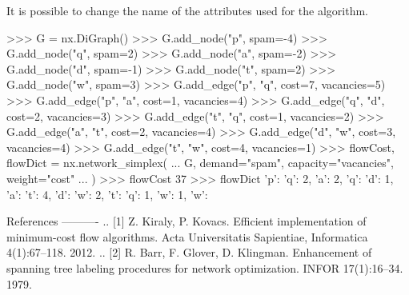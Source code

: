 \begin{DoxyVerb}
It is possible to change the name of the attributes used for the
algorithm.

>>> G = nx.DiGraph()
>>> G.add_node("p", spam=-4)
>>> G.add_node("q", spam=2)
>>> G.add_node("a", spam=-2)
>>> G.add_node("d", spam=-1)
>>> G.add_node("t", spam=2)
>>> G.add_node("w", spam=3)
>>> G.add_edge("p", "q", cost=7, vacancies=5)
>>> G.add_edge("p", "a", cost=1, vacancies=4)
>>> G.add_edge("q", "d", cost=2, vacancies=3)
>>> G.add_edge("t", "q", cost=1, vacancies=2)
>>> G.add_edge("a", "t", cost=2, vacancies=4)
>>> G.add_edge("d", "w", cost=3, vacancies=4)
>>> G.add_edge("t", "w", cost=4, vacancies=1)
>>> flowCost, flowDict = nx.network_simplex(
...     G, demand="spam", capacity="vacancies", weight="cost"
... )
>>> flowCost
37
>>> flowDict
{'p': {'q': 2, 'a': 2}, 'q': {'d': 1}, 'a': {'t': 4}, 'd': {'w': 2}, 't': {'q': 1, 'w': 1}, 'w': {}}

References
----------
.. [1] Z. Kiraly, P. Kovacs.
       Efficient implementation of minimum-cost flow algorithms.
       Acta Universitatis Sapientiae, Informatica 4(1):67--118. 2012.
.. [2] R. Barr, F. Glover, D. Klingman.
       Enhancement of spanning tree labeling procedures for network
       optimization.
       INFOR 17(1):16--34. 1979.
\end{DoxyVerb}
 